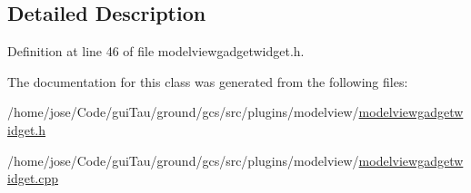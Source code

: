 \subsection{Detailed Description}


Definition at line 46 of file modelviewgadgetwidget.\-h.



The documentation for this class was generated from the following files\-:\begin{DoxyCompactItemize}
\item 
/home/jose/\-Code/gui\-Tau/ground/gcs/src/plugins/modelview/\hyperlink{modelviewgadgetwidget_8h}{modelviewgadgetwidget.\-h}\item 
/home/jose/\-Code/gui\-Tau/ground/gcs/src/plugins/modelview/\hyperlink{modelviewgadgetwidget_8cpp}{modelviewgadgetwidget.\-cpp}\end{DoxyCompactItemize}
